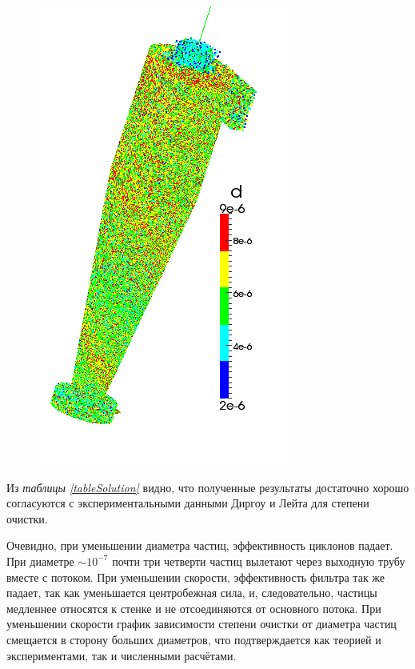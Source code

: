 \begin{figure}[h]
\begin{minipage}{0.2\linewidth}
	\end{minipage}
		\hspace{-1em}
	\begin{minipage}{0.2\linewidth}
		\includegraphics[scale=0.3]{t10}
	\end{minipage}
	\label{fig:t1}
\end{figure}
Из \textit{таблицы \ref{tableSolution}} видно, что полученные результаты достаточно хорошо согласуются с экспериментальными данными Диргоу и Лейта для степени очистки.

Очевидно, при уменьшении диаметра частиц, эффективность циклонов падает. При диаметре $ \sim 10^{-7}$ почти три четверти частиц вылетают через выходную трубу вместе с потоком. При уменьшении скорости, эффективность фильтра так же падает, так как уменьшается центробежная сила, и, следовательно, частицы медленнее относятся к стенке и не отсоединяются от основного потока. При уменьшении скорости график зависимости степени очистки от диаметра частиц смещается в сторону больших диаметров, что подтверждается как теорией и экспериментами, так и численными расчётами.

